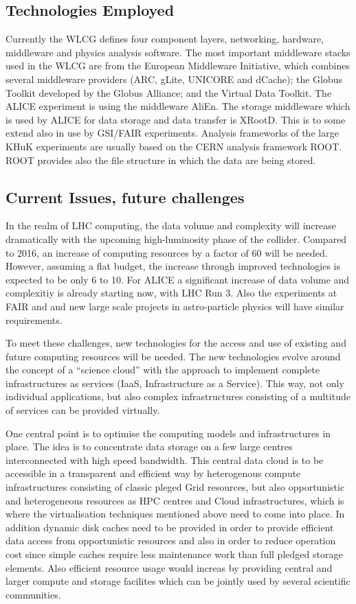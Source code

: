 \subsection{Technologies Employed}
Currently the WLCG defines four component layers,  networking, hardware, middleware and
physics analysis software. The most important middleware stacks used
in the WLCG are from the European Middleware Initiative, which
combines several middleware providers (ARC, gLite, UNICORE and
dCache); the Globus Toolkit developed by the Globus Alliance; and the
Virtual Data Toolkit. The ALICE experiment is using the middleware AliEn.
The storage middleware which is used by ALICE for data storage and data transfer is XRootD.
This is to some extend also in use by GSI/FAIR experiments.
Analysis frameworks of the large KHuK experiments are usually based on the CERN analysis framework ROOT.
ROOT provides also the file structure in which the data are being stored.


\subsection{Current Issues, future challenges}
In the realm of LHC computing, the data volume and complexity will
increase dramatically with the upcoming high-luminosity phase of the
collider. Compared to 2016, an increase of computing resources by a
factor of 60 will be needed. However, assuming a flat budget, the
increase through improved technologies is expected to be only 6 to 10. 
For ALICE a significant increase of data volume and complexitiy is already starting now, with
LHC Run 3.
Also the
experiments at FAIR  and and new large scale projects in astro-particle
physics will have similar requirements. 

To meet these challenges, new technologies for the access and use of
existing and future computing resources will be needed. The new
technologies evolve around the concept of a ``science cloud'' with the
approach to implement complete infrastructures as services (IaaS,
Infrastructure as a Service). This way, not only individual
applications, but also complex infrastructures consisting of a
multitude of services can be provided virtually. 

One central point is to optimise the computing models and infrastructures in place.
The idea is to concentrate data storage on a few large centres interconnected with high speed bandwidth.
This central data cloud is to be accessible in a transparent and efficient way by heterogenous compute infrastructures 
consisting of classic pleged Grid resources, but also opportunistic and heterogeneous resources as HPC centres and Cloud infrastructures,
which is where the virtualisation techniques mentioned above need to come into place.
In addition dynamic disk caches need to be provided in order to provide efficient data access from opportunistic resources and also
in order to reduce operation cost since simple caches require less maintenance work than full pledged storage elements.
Also efficient resource usage would increas by providing central and larger compute and storage facilites which can be jointly used by
several scientific communities.

